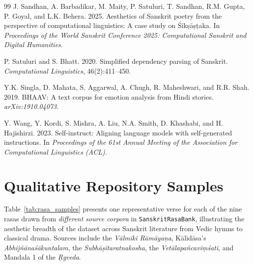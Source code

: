 \documentclass[11pt]{article}
\begin{document}
\begin{thebibliography}{99}
 J. Sandhan, A. Barbadikar, M. Maity, P. Satuluri, T. Sandhan, R.M. Gupta, P. Goyal, and L.K. Behera. 2025. Aesthetics of Sanskrit poetry from the perspective of computational linguistics: A case study on Śik\d s\=a\d s\d taka. In \emph{Proceedings of the World Sanskrit Conference 2025: Computational Sanskrit and Digital Humanities}.

 P. Satuluri and S. Bhatt. 2020. Simplified dependency parsing of Sanskrit. \emph{Computational Linguistics}, 46(2):411--450.

 Y.K. Singla, D. Mahata, S. Aggarwal, A. Chugh, R. Maheshwari, and R.R. Shah. 2019. BHAAV: A text corpus for emotion analysis from Hindi stories. \emph{arXiv:1910.04073}.

 Y. Wang, Y. Kordi, S. Mishra, A. Liu, N.A. Smith, D. Khashabi, and H. Hajishirzi. 2023. Self-instruct: Aligning language models with self-generated instructions. In \emph{Proceedings of the 61st Annual Meeting of the Association for Computational Linguistics (ACL)}.

\end{thebibliography}

\appendix
\section{Qualitative Repository Samples}
\label{sec:appendix}

Table~\ref{tab:rasa_samples} presents one representative verse for each of the nine rasas drawn from \emph{different source corpora} in \texttt{SanskritRasaBank}, illustrating the aesthetic breadth of the dataset across Sanskrit literature from Vedic hymns to classical drama. Sources include the \textit{V\=alm\=iki R\=am\=aya\d na}, K\=alid\=asa's \textit{Abhij\~n\=anaś\=akuntalam}, the \textit{Subh\=a\d sitaratnakosha}, the \textit{Vet\=alapañcavi\d m\'{s}ati}, and Mandala 1 of the \textit{\d Rgveda}.
\end{document}
